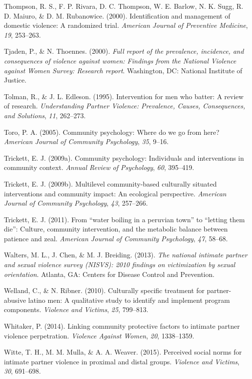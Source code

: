 \documentclass[11pt,]{tufte-book}
\begin{document}
\hypertarget{ref-thompson2000identification}{}
Thompson, R. S., F. P. Rivara, D. C. Thompson, W. E. Barlow, N. K. Sugg,
R. D. Maiuro, \& D. M. Rubanowice. (2000). Identification and management
of domestic violence: A randomized trial. \emph{American Journal of
Preventive Medicine}, \emph{19}, 253--263.

\hypertarget{ref-tjaden2000full}{}
Tjaden, P., \& N. Thoennes. (2000). \emph{Full report of the prevalence,
incidence, and consequences of violence against women: Findings from the
National Violence against Women Survey: Research report}. Washington,
DC: National Institute of Justice.

\hypertarget{ref-tolman1995intervention}{}
Tolman, R., \& J. L. Edleson. (1995). Intervention for men who batter: A
review of research. \emph{Understanding Partner Violence: Prevalence,
Causes, Consequences, and Solutions}, \emph{11}, 262--273.

\hypertarget{ref-toro2005community}{}
Toro, P. A. (2005). Community psychology: Where do we go from here?
\emph{American Journal of Community Psychology}, \emph{35}, 9--16.

\hypertarget{ref-trickett2009community}{}
Trickett, E. J. (2009a). Community psychology: Individuals and
interventions in community context. \emph{Annual Review of Psychology},
\emph{60}, 395--419.

\hypertarget{ref-trickett2009multilevel}{}
Trickett, E. J. (2009b). Multilevel community-based culturally situated
interventions and community impact: An ecological perspective.
\emph{American Journal of Community Psychology}, \emph{43}, 257--266.

\hypertarget{ref-trickett2011water}{}
Trickett, E. J. (2011). From ``water boiling in a peruvian town'' to
``letting them die'': Culture, community intervention, and the metabolic
balance between patience and zeal. \emph{American Journal of Community
Psychology}, \emph{47}, 58--68.

\hypertarget{ref-walters2013national}{}
Walters, M. L., J. Chen, \& M. J. Breiding. (2013). \emph{The national
intimate partner and sexual violence survey (NISVS): 2010 findings on
victimization by sexual orientation}. Atlanta, GA: Centers for Disease
Control and Prevention.

\hypertarget{ref-welland2010culturally}{}
Welland, C., \& N. Ribner. (2010). Culturally specific treatment for
partner-abusive latino men: A qualitative study to identify and
implement program components. \emph{Violence and Victims}, \emph{25},
799--813.

\hypertarget{ref-whitaker2014linking}{}
Whitaker, P. (2014). Linking community protective factors to intimate
partner violence perpetration. \emph{Violence Against Women}, \emph{20},
1338--1359.

\hypertarget{ref-witte2015perceived}{}
Witte, T. H., M. M. Mulla, \& A. A. Weaver. (2015). Perceived social
norms for intimate partner violence in proximal and distal groups.
\emph{Violence and Victims}, \emph{30}, 691--698.
\end{document}
